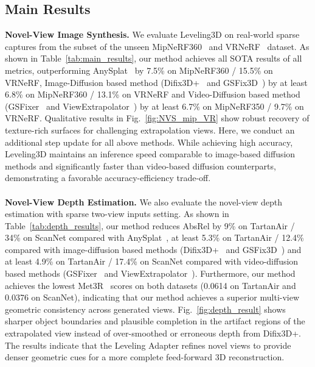 \subsection{Main Results}
\noindent\textbf{Novel-View Image Synthesis.} We evaluate Leveling3D on real-world sparse captures from the subset of the unseen MipNeRF360~\cite{barron2022mip} and VRNeRF~\cite{xu2023vr} dataset. As shown in Table~\ref{tab:main_results}, our method achieves all SOTA results of all metrics, outperforming AnySplat~\cite{jiang2025anysplat} by 7.5\% on MipNeRF360 / 15.5\% on VRNeRF, Image-Diffusion based method (Difix3D+~\cite{wu2025difix3d+} and GSFix3D~\cite{wei2025gsfix3d}) by at least 6.8\% on MipNeRF360 / 13.1\% on VRNeRF and Video-Diffusion based method (GSFixer~\cite{yin2025gsfixer} and ViewExtrapolator~\cite{viewextrapolator}) by at least 6.7\% on MipNeRF350 / 9.7\% on VRNeRF. Qualitative results in Fig.~\ref{fig:NVS_mip_VR} show robust recovery of texture-rich surfaces for challenging extrapolation views. Here, we conduct an additional step update for all above methods. While achieving high accuracy, Leveling3D maintains an inference speed comparable to image-based diffusion methods and significantly faster than video-based diffusion counterparts, demonstrating a favorable accuracy-efficiency trade-off.
\\
\\


\noindent\textbf{Novel-View Depth Estimation.} We also evaluate the novel-view depth estimation with sparse two-view inputs setting. As shown in Table~\ref{tab:depth_results}, our method reduces AbsRel by 9\% on TartanAir / 34\% on ScanNet compared with AnySplat~\cite{jiang2025anysplat}, at least 5.3\% on TartanAir / 12.4\% compared with image-diffusion based methods (Difix3D+~\cite{wu2025difix3d+} and GSFix3D~\cite{wei2025gsfix3d}) and at least 4.9\% on TartanAir / 17.4\% on ScanNet compared with video-diffusion based methods (GSFixer~\cite{yin2025gsfixer} and ViewExtrapolator~\cite{viewextrapolator}). Furthermore, our method achieves the lowest Met3R~\cite{asim25met3r} scores on both datasets (0.0614 on TartanAir and 0.0376 on ScanNet), indicating that our method achieves a superior multi-view geometric consistency across generated views. Fig.~\ref{fig:depth_result} shows sharper object boundaries and plausible completion in the artifact regions of the extrapolated view instead of over-smoothed or erroneous depth from Difix3D+. The results indicate that the Leveling Adapter refines novel views to provide denser geometric cues for a more complete feed-forward 3D reconstruction.

